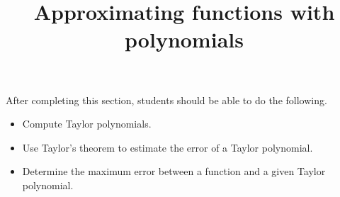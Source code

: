 \documentclass{ximera}
\title{Approximating functions with polynomials}
\begin{document}
\begin{abstract}
\end{abstract}

\maketitle

\begin{sectionOutcomes}

After completing this section, students should be able to do the following.

\begin{itemize}
\item Compute Taylor polynomials.
\item Use Taylor's theorem to estimate the error of a Taylor polynomial.
\item Determine the maximum error between a function and a given
  Taylor polynomial.
\end{itemize}

\end{sectionOutcomes}
\end{document}
